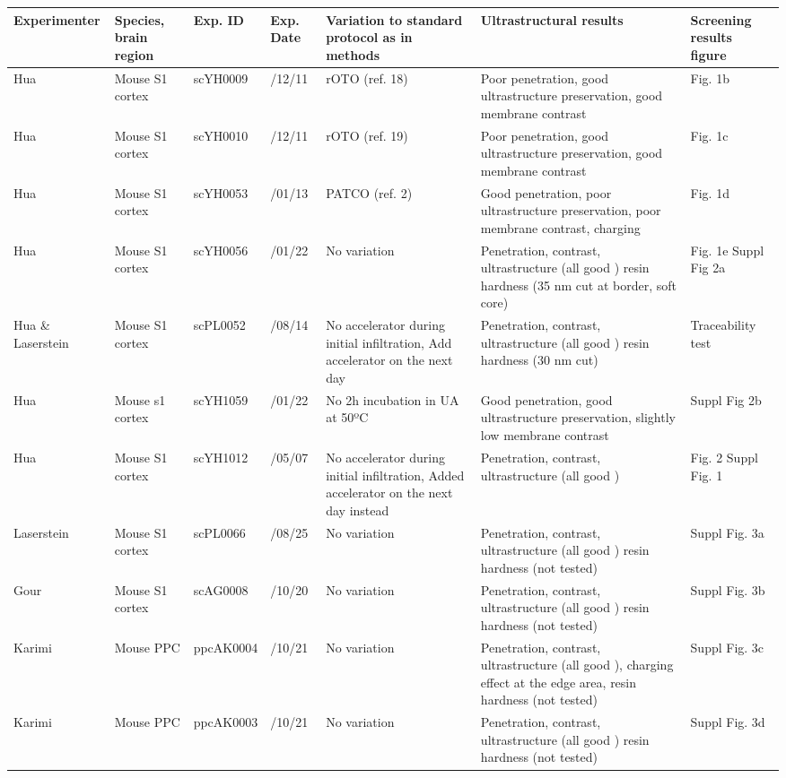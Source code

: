 \documentclass{article}
\begin{document}
\begin{center}
\scriptsize
\begin{tabular}{|>{\raggedright\arraybackslash}p{1.5cm}|>{\raggedright\arraybackslash}p{1.6cm}|>{\raggedright\arraybackslash}p{1.3cm}|>{\raggedright\arraybackslash}p{1.3cm}|>{\raggedright\arraybackslash}p{2.6cm}|>{\raggedright\arraybackslash}p{3.0cm}|>{\raggedright\arraybackslash}p{1.5cm}|}
\hline
Experimenter & Species, brain region & Exp. ID & Exp. Date & Variation to standard protocol as in methods & Ultrastructural results & Screening results figure \\ \hline
Hua & Mouse S1 cortex & scYH0009 & 2013/12/11 & rOTO (ref. 18) & Poor penetration, good ultrastructure preservation, good membrane contrast & Fig. 1b \\ \hline
Hua & Mouse S1 cortex & scYH0010 & 2013/12/11 & rOTO (ref. 19) & Poor penetration, good ultrastructure preservation, good membrane contrast & Fig. 1c \\ \hline
Hua & Mouse S1 cortex & scYH0053 & 2014/01/13 & PATCO (ref. 2) & Good penetration, poor ultrastructure preservation, poor membrane contrast, charging & Fig. 1d \\ \hline
Hua & Mouse S1 cortex & scYH0056 & 2014/01/22 & No variation & Penetration, contrast, ultrastructure (all good ) resin hardness (35 nm cut at border, soft core) & Fig. 1e Suppl Fig 2a \\ \hline
Hua \& Laserstein & Mouse S1 cortex & scPL0052 & 2014/08/14 & No accelerator during initial infiltration, Add accelerator on the next day & Penetration, contrast, ultrastructure (all good ) resin hardness (30 nm cut) & Traceability test \\ \hline
Hua & Mouse s1 cortex & scYH1059 & 2014/01/22 & No 2h incubation in UA at 50ºC & Good penetration, good ultrastructure preservation, slightly low membrane contrast & Suppl Fig 2b \\ \hline
Hua & Mouse S1 cortex & scYH1012 & 2015/05/07 & No accelerator during initial infiltration, Added accelerator on the next day instead & Penetration, contrast, ultrastructure (all good ) & Fig. 2 Suppl Fig. 1 \\ \hline
Laserstein & Mouse S1 cortex & scPL0066 & 2014/08/25 & No variation & Penetration, contrast, ultrastructure (all good ) resin hardness (not tested) & Suppl Fig. 3a \\ \hline
Gour & Mouse S1 cortex & scAG0008 & 2014/10/20 & No variation & Penetration, contrast, ultrastructure (all good ) resin hardness (not tested) & Suppl Fig. 3b \\ \hline
Karimi & Mouse PPC & ppcAK0004 & 2014/10/21 & No variation & Penetration, contrast, ultrastructure (all good ), charging effect at the edge area, resin hardness (not tested) & Suppl Fig. 3c \\ \hline
Karimi & Mouse PPC & ppcAK0003 & 2014/10/21 & No variation & Penetration, contrast, ultrastructure (all good ) resin hardness (not tested) & Suppl Fig. 3d \\ \hline
\end{tabular}
\end{center}
\end{document}

